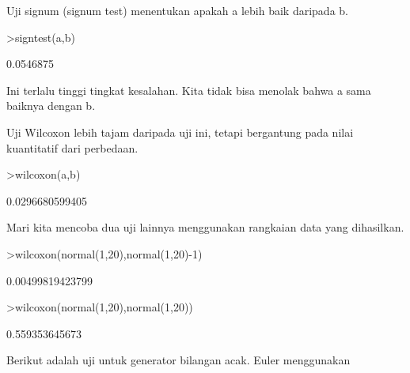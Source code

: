 \documentclass[12pt,arial,letterpaper]{book}
\begin{document}
\begin{eulercomment}
\begin{eulercomment}
\begin{eulercomment}
\begin{eulercomment}
\begin{eulercomment}
\begin{eulercomment}
\begin{eulercomment}
\begin{eulercomment}
\begin{eulercomment}
\begin{eulercomment}
\begin{eulercomment}
\begin{eulercomment}
\begin{eulercomment}
\begin{eulercomment}
\begin{eulercomment}
\begin{eulercomment}
\begin{eulercomment}
\begin{eulercomment}
\begin{eulercomment}
\begin{eulercomment}
\begin{eulercomment}
\begin{eulercomment}
\begin{eulercomment}
\begin{eulercomment}
\begin{eulercomment}
\begin{eulercomment}
\begin{eulercomment}
\begin{eulercomment}
\begin{eulercomment}
\begin{eulercomment}
\begin{eulercomment}
\begin{eulercomment}
\begin{eulercomment}
\begin{eulercomment}
\begin{eulercomment}
Uji signum (signum test) menentukan apakah a lebih baik daripada b.
\end{eulercomment}
\begin{eulerprompt}
>signtest(a,b)
\end{eulerprompt}
\begin{euleroutput}
  0.0546875
\end{euleroutput}
\begin{eulercomment}
Ini terlalu tinggi tingkat kesalahan. Kita tidak bisa menolak bahwa a
sama baiknya dengan b.

Uji Wilcoxon lebih tajam daripada uji ini, tetapi bergantung pada
nilai kuantitatif dari perbedaan.
\end{eulercomment}
\begin{eulerprompt}
>wilcoxon(a,b)
\end{eulerprompt}
\begin{euleroutput}
  0.0296680599405
\end{euleroutput}
\begin{eulercomment}
Mari kita mencoba dua uji lainnya menggunakan rangkaian data yang
dihasilkan.
\end{eulercomment}
\begin{eulerprompt}
>wilcoxon(normal(1,20),normal(1,20)-1)
\end{eulerprompt}
\begin{euleroutput}
  0.00499819423799
\end{euleroutput}
\begin{eulerprompt}
>wilcoxon(normal(1,20),normal(1,20))
\end{eulerprompt}
\begin{euleroutput}
  0.559353645673
\end{euleroutput}
\begin{eulercomment}
Berikut adalah uji untuk generator bilangan acak. Euler menggunakan

\end{eulercomment}
\end{eulercomment}
\end{eulercomment}
\end{eulercomment}
\end{eulercomment}
\end{eulercomment}
\end{eulercomment}
\end{eulercomment}
\end{eulercomment}
\end{eulercomment}
\end{eulercomment}
\end{eulercomment}
\end{eulercomment}
\end{eulercomment}
\end{eulercomment}
\end{eulercomment}
\end{eulercomment}
\end{eulercomment}
\end{eulercomment}
\end{eulercomment}
\end{eulercomment}
\end{eulercomment}
\end{eulercomment}
\end{eulercomment}
\end{eulercomment}
\end{eulercomment}
\end{eulercomment}
\end{eulercomment}
\end{eulercomment}
\end{eulercomment}
\end{eulercomment}
\end{eulercomment}
\end{eulercomment}
\end{eulercomment}
\end{eulercomment}
\end{document}
